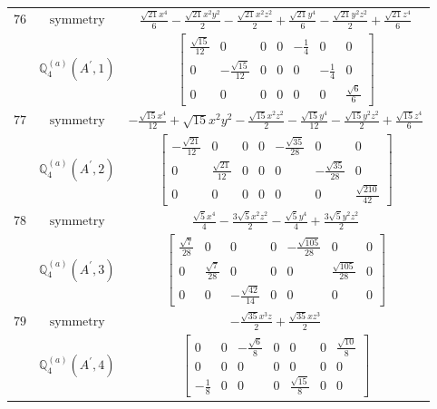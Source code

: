 \documentclass[fleqn,8pt,landscape]{jsarticle}
\begin{document}
\begin{longtable}{ccc}
$ 76 $ & $ \text{symmetry} $ & $ \frac{\sqrt{21} x^{4}}{6} - \frac{\sqrt{21} x^{2} y^{2}}{2} - \frac{\sqrt{21} x^{2} z^{2}}{2} + \frac{\sqrt{21} y^{4}}{6} - \frac{\sqrt{21} y^{2} z^{2}}{2} + \frac{\sqrt{21} z^{4}}{6} $ \\
$  $ & $ \mathbb{Q}_{4}^{(a)}(A^{\prime},1) $ & $ \begin{bmatrix} \frac{\sqrt{15}}{12} & 0 & 0 & 0 & - \frac{1}{4} & 0 & 0 \\ 0 & - \frac{\sqrt{15}}{12} & 0 & 0 & 0 & - \frac{1}{4} & 0 \\ 0 & 0 & 0 & 0 & 0 & 0 & \frac{\sqrt{6}}{6} \end{bmatrix} $ \\ \hline
$ 77 $ & $ \text{symmetry} $ & $ - \frac{\sqrt{15} x^{4}}{12} + \sqrt{15} x^{2} y^{2} - \frac{\sqrt{15} x^{2} z^{2}}{2} - \frac{\sqrt{15} y^{4}}{12} - \frac{\sqrt{15} y^{2} z^{2}}{2} + \frac{\sqrt{15} z^{4}}{6} $ \\
$  $ & $ \mathbb{Q}_{4}^{(a)}(A^{\prime},2) $ & $ \begin{bmatrix} - \frac{\sqrt{21}}{12} & 0 & 0 & 0 & - \frac{\sqrt{35}}{28} & 0 & 0 \\ 0 & \frac{\sqrt{21}}{12} & 0 & 0 & 0 & - \frac{\sqrt{35}}{28} & 0 \\ 0 & 0 & 0 & 0 & 0 & 0 & \frac{\sqrt{210}}{42} \end{bmatrix} $ \\ \hline
$ 78 $ & $ \text{symmetry} $ & $ \frac{\sqrt{5} x^{4}}{4} - \frac{3 \sqrt{5} x^{2} z^{2}}{2} - \frac{\sqrt{5} y^{4}}{4} + \frac{3 \sqrt{5} y^{2} z^{2}}{2} $ \\
$  $ & $ \mathbb{Q}_{4}^{(a)}(A^{\prime},3) $ & $ \begin{bmatrix} \frac{\sqrt{7}}{28} & 0 & 0 & 0 & - \frac{\sqrt{105}}{28} & 0 & 0 \\ 0 & \frac{\sqrt{7}}{28} & 0 & 0 & 0 & \frac{\sqrt{105}}{28} & 0 \\ 0 & 0 & - \frac{\sqrt{42}}{14} & 0 & 0 & 0 & 0 \end{bmatrix} $ \\ \hline
$ 79 $ & $ \text{symmetry} $ & $ - \frac{\sqrt{35} x^{3} z}{2} + \frac{\sqrt{35} x z^{3}}{2} $ \\
$  $ & $ \mathbb{Q}_{4}^{(a)}(A^{\prime},4) $ & $ \begin{bmatrix} 0 & 0 & - \frac{\sqrt{6}}{8} & 0 & 0 & 0 & \frac{\sqrt{10}}{8} \\ 0 & 0 & 0 & 0 & 0 & 0 & 0 \\ - \frac{1}{8} & 0 & 0 & 0 & \frac{\sqrt{15}}{8} & 0 & 0 \end{bmatrix} $ \\ \hline

\end{longtable}
\end{document}
